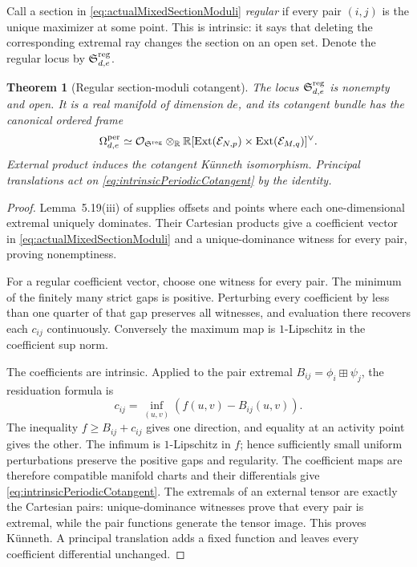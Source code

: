 \documentclass[11pt]{amsart}
\newtheorem{theorem}{Theorem}[section]
\theoremstyle{definition}
\theoremstyle{remark}
\newcommand{\R}{\mathbb R}
\begin{document}
Call a section in \eqref{eq:actualMixedSectionModuli} \emph{regular} if
every pair $(i,j)$ is the unique maximizer at some point.  This is
intrinsic: it says that deleting the corresponding extremal ray changes
the section on an open set.  Denote the regular locus by
$\mathfrak S_{d,e}^{\rm reg}$.

\begin{theorem}[Regular section-moduli cotangent]
\label{thm:regularSectionCotangent}
The locus $\mathfrak S_{d,e}^{\rm reg}$ is nonempty and open.  It is a real
manifold of dimension $de$, and its cotangent bundle has the canonical
ordered frame
\begin{equation}\label{eq:intrinsicPeriodicCotangent}
 \Omega_{d,e}^{\rm per}
 \simeq\mathcal O_{\mathfrak S^{\rm reg}}
   \otimes_\R\R[\operatorname{Ext}(\mathcal E_{N,p})
                 \times\operatorname{Ext}(\mathcal E_{M,q})]^\vee.
\end{equation}
External product induces the cotangent K\"unneth isomorphism.  Principal
translations act on \eqref{eq:intrinsicPeriodicCotangent} by the identity.
\end{theorem}

\begin{proof}
Lemma~5.19(iii) of \cite{CC-ScalingSite} supplies offsets and points where
each one-dimensional extremal uniquely dominates.  Their Cartesian
products give a coefficient vector in \eqref{eq:actualMixedSectionModuli}
and a unique-dominance witness for every pair, proving nonemptiness.

For a regular coefficient vector, choose one witness for every pair.  The
minimum of the finitely many strict gaps is positive.  Perturbing every
coefficient by less than one quarter of that gap preserves all witnesses,
and evaluation there recovers each $c_{ij}$ continuously.  Conversely the
maximum map is $1$-Lipschitz in the coefficient sup norm.

The coefficients are intrinsic.  Applied to the pair extremal
$B_{ij}=\phi_i\boxplus\psi_j$, the residuation formula is
\[
 c_{ij}=\inf_{(u,v)}(f(u,v)-B_{ij}(u,v)).
\]
The inequality $f\geq B_{ij}+c_{ij}$ gives one direction, and equality at
an activity point gives the other.  The infimum is $1$-Lipschitz in $f$;
hence sufficiently small uniform perturbations preserve the positive gaps
and regularity.  The coefficient maps are therefore compatible manifold
charts and their differentials give \eqref{eq:intrinsicPeriodicCotangent}.
The extremals of an external tensor are exactly the Cartesian pairs:
unique-dominance witnesses prove that every pair is extremal, while the
pair functions generate the tensor image.  This proves K\"unneth.  A
principal translation adds a fixed function and leaves every coefficient
differential unchanged.
\end{proof}
\end{document}
